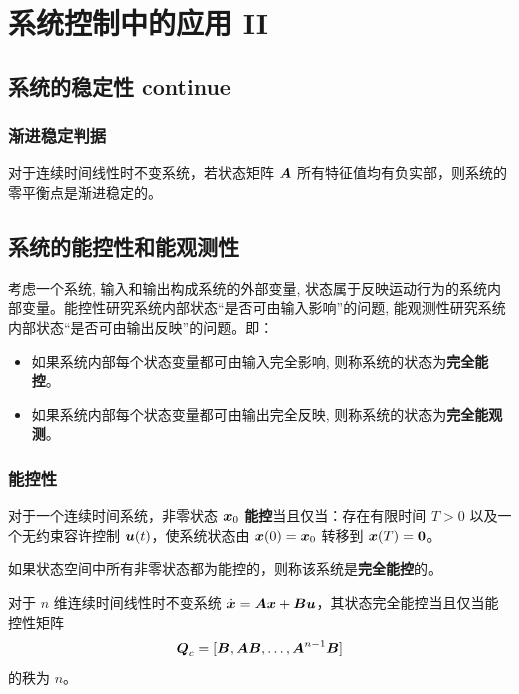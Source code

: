 \section{系统控制中的应用 II}

\subsection{系统的稳定性 continue}

\subsubsection{渐进稳定判据}

\begin{theorem}
    对于连续时间线性时不变系统，若状态矩阵 $\boldsymbol{A}$ 所有特征值均有负实部，则系统的零平衡点是渐进稳定的。
\end{theorem}

\subsection{系统的能控性和能观测性}

考虑一个系统, 输入和输出构成系统的外部变量, 状态属于反映运动行为的系统内部变量。能控性研究系统内部状态“是否可由输入影响”的问题, 能观测性研究系统内部状态“是否可由输出反映”的问题。即：

\begin{itemize}
    \item 如果系统内部每个状态变量都可由输入完全影响, 则称系统的状态为\textbf{完全能控}。
    \item 如果系统内部每个状态变量都可由输出完全反映, 则称系统的状态为\textbf{完全能观测}。
\end{itemize}

\subsubsection{能控性}

\begin{definition}[连续时间系统的能控性]
    对于一个连续时间系统，非零状态 $\boldsymbol{x}_0$ \textbf{能控}当且仅当：存在有限时间 $T > 0$ 以及一个无约束容许控制 $\boldsymbol{u}(t)$，使系统状态由 $\boldsymbol{x}(0) = \boldsymbol{x}_0$ 转移到 $\boldsymbol{x}(T) = \boldsymbol{0}$。

    如果状态空间中所有非零状态都为能控的，则称该系统是\textbf{完全能控}的。
\end{definition}

\begin{theorem}[秩判据]
    对于 $n$ 维连续时间线性时不变系统 $\dot{\boldsymbol{x}} = \boldsymbol{A} \boldsymbol{x} + \boldsymbol{B} \boldsymbol{u}$，其状态完全能控当且仅当能控性矩阵
    $$
    \boldsymbol{Q}_c = [\boldsymbol{B}, \boldsymbol{A}\boldsymbol{B}, \dots, \boldsymbol{A}^{n-1}\boldsymbol{B}]
    $$
    的秩为 $n$。
\end{theorem}


